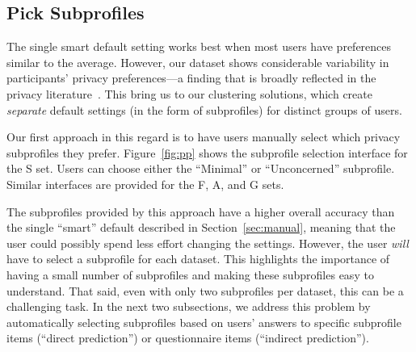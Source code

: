 \subsection{Pick Subprofiles}

The single smart default setting works best when most users have preferences similar to the average. However, our dataset shows considerable variability in participants' privacy preferences---a finding that is broadly reflected in the privacy literature~\cite{knijnenburg2013dimensionality}. This bring us to our clustering solutions, which create \emph{separate} default settings (in the form of subprofiles) for distinct groups of users.

Our first approach in this regard is to have users manually select which privacy subprofiles they prefer. Figure~\ref{fig:pp} shows the subprofile selection interface for the S set. Users can choose either the ``Minimal'' or ``Unconcerned'' subprofile. Similar interfaces are provided for the F, A, and G sets.

The subprofiles provided by this approach have a higher overall accuracy than the single ``smart'' default described in Section~\ref{sec:manual}, meaning that the user could possibly spend less effort changing the settings. However, the user \emph{will} have to select a subprofile for each dataset. This highlights the importance of having a small number of subprofiles and making these subprofiles easy to understand. That said, even with only two subprofiles per dataset, this can be a challenging task. In the next two subsections, we address this problem by automatically selecting subprofiles based on users' answers to specific subprofile items (``direct prediction'') or questionnaire items (``indirect prediction'').

